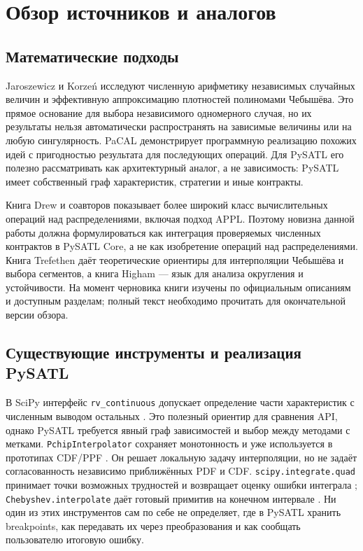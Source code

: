 \documentclass[12pt,a4paper]{article}
\begin{document}
\section{Обзор источников и аналогов}
\subsection{Математические подходы}
Jaroszewicz и Korzeń \cite{jaroszewicz2012} исследуют численную арифметику независимых случайных величин и эффективную аппроксимацию плотностей полиномами Чебышёва. Это прямое основание для выбора независимого одномерного случая, но их результаты нельзя автоматически распространять на зависимые величины или на любую сингулярность. PaCAL \cite{pacal} демонстрирует программную реализацию похожих идей с пригодностью результата для последующих операций. Для PySATL его полезно рассматривать как архитектурный аналог, а не зависимость: PySATL имеет собственный граф характеристик, стратегии и иные контракты.

Книга Drew и соавторов \cite{drew2017} показывает более широкий класс вычислительных операций над распределениями, включая подход APPL. Поэтому новизна данной работы должна формулироваться как интеграция проверяемых численных контрактов в PySATL Core, а не как изобретение операций над распределениями. Книга Trefethen \cite{trefethen2019} даёт теоретические ориентиры для интерполяции Чебышёва и выбора сегментов, а книга Higham \cite{higham2002} — язык для анализа округления и устойчивости. На момент черновика книги изучены по официальным описаниям и доступным разделам; полный текст необходимо прочитать для окончательной версии обзора.

\subsection{Существующие инструменты и реализация PySATL}
В SciPy интерфейс \texttt{rv\_continuous} допускает определение части характеристик с численным выводом остальных \cite{scipyrv}. Это полезный ориентир для сравнения API, однако PySATL требуется явный граф зависимостей и выбор между методами с метками. \texttt{PchipInterpolator} сохраняет монотонность и уже используется в прототипах CDF/PPF \cite{scipypchip}. Он решает локальную задачу интерполяции, но не задаёт согласованность независимо приближённых PDF и CDF. \texttt{scipy.integrate.quad} принимает точки возможных трудностей и возвращает оценку ошибки интеграла \cite{scipyquad}; \texttt{Chebyshev.interpolate} даёт готовый примитив на конечном интервале \cite{numpycheb}. Ни один из этих инструментов сам по себе не определяет, где в PySATL хранить breakpoints, как передавать их через преобразования и как сообщать пользователю итоговую ошибку.
\end{document}
